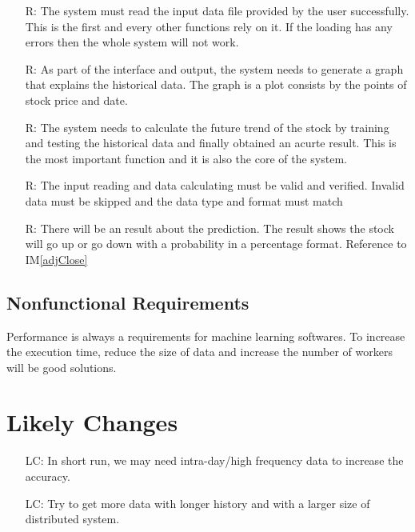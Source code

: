 \documentclass[12pt]{article}
\newcommand{\iref}[1]{IM\ref{#1}}
\newcounter{reqnum} %
\newcounter{lcnum} %
\begin{document}
\noindent \begin{itemize}

\item[R\refstepcounter{reqnum}\thereqnum \label{R_Inputs}:] The system must read the input data file provided by the user successfully. This is the first and every other functions rely on it. If the loading has any errors then the whole system will not work. 

\item[R\refstepcounter{reqnum}\thereqnum \label{R_OutputInputs}:] As part of the interface and output, the system needs to generate a graph that explains the historical data. The graph is a plot consists by the points of stock price and date. 


\item[R\refstepcounter{reqnum}\thereqnum \label{R_Calculate}:] The system needs to calculate the future trend of the stock by training and testing the historical data and finally obtained an acurte result. This is the most important function and it is also the core of the system.

\item[R\refstepcounter{reqnum}\thereqnum \label{R_VerifyOutput}:] The input reading and data calculating must be valid and verified. Invalid data must be skipped and the data type and format must match

\item[R\refstepcounter{reqnum}\thereqnum \label{R_Output}:] There will be an result about the prediction. The result shows the stock will go up or go down with a probability in a percentage format. Reference to \iref{adjClose}
\end{itemize}


\subsection{Nonfunctional Requirements}
Performance is always a requirements for machine learning softwares. To increase the execution time, reduce the size of data and increase the number of workers will be good solutions. 

\section{Likely Changes} 

\noindent \begin{itemize}

\item[LC\refstepcounter{lcnum}\thelcnum\label{LC1}:] In short run, we may need intra-day/high frequency data to increase the accuracy.
\item[LC\refstepcounter{lcnum}\thelcnum\label{LC2}:] Try to get more data with longer history and with a larger size of distributed system.
\end{itemize}
\end{document}
